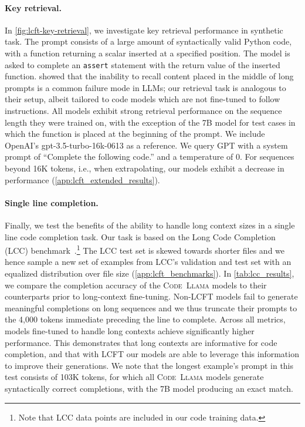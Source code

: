 \paragraph{Key retrieval.} In \ref{fig:lcft-key-retrieval}, we investigate key retrieval performance in synthetic task. The prompt consists of a large amount of syntactically valid Python code, with a function returning a scalar inserted at a specified position. The model is asked to complete an \texttt{assert} statement with the return value of the inserted function.
\citet{liu2023lost} showed that the inability to recall content placed in the middle of long prompts is a common failure mode in LLMs; our retrieval task is analogous to their setup, albeit tailored to code models which are not fine-tuned to follow instructions. All models exhibit strong retrieval performance on the sequence length they were trained on, with the exception of the 7B model for test cases in which the function is placed at the beginning of the prompt. We include OpenAI’s gpt-3.5-turbo-16k-0613 as a reference. We query GPT with a system prompt of ``Complete the following code.'' and a temperature of 0. For sequences beyond 16K tokens, i.e., when extrapolating, our models exhibit a decrease in performance (\ref{app:lcft_extended_results}).

\paragraph{Single line completion.} Finally, we test the benefits of the ability to handle long context sizes in a single line code completion task. Our task is based on the Long Code Completion (LCC) benchmark~\citep{guo2023longcoder}.\footnote{Note that LCC data points are included in our code training data.} The LCC test set is skewed towards shorter files and we hence sample a new set of examples from LCC's validation and test set with an equalized distribution over file size (\ref{app:lcft_benchmarks}).
In \ref{tab:lcc_results}, we compare the completion accuracy of the \textsc{Code~Llama} models to their counterparts prior to long-context fine-tuning. Non-LCFT models fail to generate meaningful completions on long sequences and we thus truncate their prompts to the 4,000 tokens immediate preceding the line to complete. Across all metrics, models fine-tuned to handle long contexts achieve significantly higher performance. This demonstrates that long contexts are informative for code completion, and that with LCFT our models are able to leverage this information to improve their generations. We note that the longest example's prompt in this test consists of 103K tokens, for which all \textsc{Code~Llama} models generate syntactically correct completions, with the 7B model producing an exact match.

